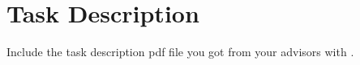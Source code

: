 \chapter{Task Description}

\sloppypar
Include the task description \gls{pdf} file you got from your advisors with \verb||.
